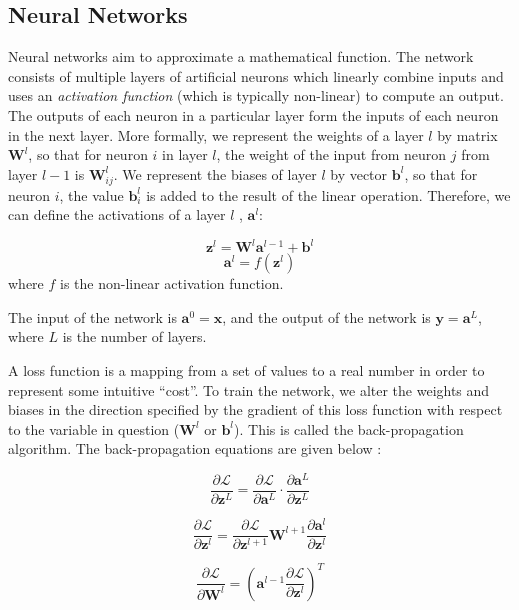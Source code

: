 \subsection{Neural Networks}

Neural networks aim to approximate a mathematical function. The network consists of multiple layers of artificial neurons which linearly combine inputs and uses an \textit{activation function} (which is typically non-linear) to compute an output. The outputs of each neuron in a particular layer form the inputs of each neuron in the next layer. More formally, we represent the weights of a layer $l$ by matrix $\boldsymbol{W}^l$, so that for neuron $i$ in layer $l$, the weight of the input from neuron $j$ from layer $l-1$ is $\boldsymbol{W}^l_{ij}$. We represent the biases of layer $l$ by vector $\boldsymbol{b}^l$, so that for neuron $i$, the value $\boldsymbol{b}^l_i$ is added to the result of the linear operation. Therefore, we can define the activations of a layer $l$ \cite{csmlnotes}, $\boldsymbol{a}^{l}$:

\[
\boldsymbol{z}^l = \boldsymbol{W}^l \boldsymbol{a}^{l-1} + \boldsymbol{b}^l
\]
\[
\boldsymbol{a}^{l} = f(\boldsymbol{z}^{l})
\]
where $f$ is the non-linear activation function.

The input of the network is $\boldsymbol{a}^0 = \boldsymbol{x}$, and the output of the network is $\boldsymbol{y} = \boldsymbol{a}^L$, where $L$ is the number of layers.

A loss function is a mapping from a set of values to a real number in order to represent some intuitive ``cost''. To train the network, we alter the weights and biases in the direction specified by the gradient of this loss function with respect to the variable in question ($\boldsymbol{W}^l$ or $\boldsymbol{b}^l$). This is called the back-propagation algorithm. The back-propagation equations are given below \cite{csmlnotes}:

\[\frac{\partial \mathcal{L}}{\partial \boldsymbol{z}^L} =\frac{\partial \mathcal{L}}{\partial \boldsymbol{a}^L} \cdot \frac{\partial \boldsymbol{a}^L}{\partial \boldsymbol{z}^L}\]

\[\frac{\partial \mathcal{L}}{\partial \boldsymbol{z}^l} = \frac{\partial \mathcal{L}}{\partial \boldsymbol{z}^{l+1}} \boldsymbol{W}^{l+1} \frac{\partial \boldsymbol{a}^l}{\partial \boldsymbol{z}^{l}}\]

\[\frac{\partial \mathcal{L}}{\partial \boldsymbol{W}^l} = (\boldsymbol{a}^{l-1} \frac{\partial \mathcal{L}}{\partial \boldsymbol{z}^l} )^T\]

